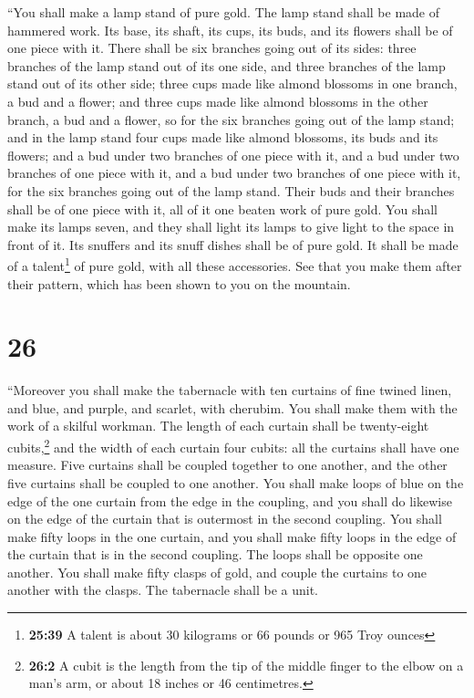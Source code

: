  ``You shall make a lamp stand of pure gold. The lamp
stand shall be made of hammered work. Its base, its shaft, its cups, its
buds, and its flowers shall be of one piece with it. 
There shall be six branches going out of its sides: three branches of
the lamp stand out of its one side, and three branches of the lamp stand
out of its other side;  three cups made like almond
blossoms in one branch, a bud and a flower; and three cups made like
almond blossoms in the other branch, a bud and a flower, so for the six
branches going out of the lamp stand;  and in the lamp
stand four cups made like almond blossoms, its buds and its flowers;
 and a bud under two branches of one piece with it, and a
bud under two branches of one piece with it, and a bud under two
branches of one piece with it, for the six branches going out of the
lamp stand.  Their buds and their branches shall be of
one piece with it, all of it one beaten work of pure gold.
 You shall make its lamps seven, and they shall light its
lamps to give light to the space in front of it.  Its
snuffers and its snuff dishes shall be of pure gold.  It
shall be made of a talent\footnote{\textbf{25:39} A talent is about 30
  kilograms or 66 pounds or 965 Troy ounces} of pure gold, with all
these accessories.  See that you make them after their
pattern, which has been shown to you on the mountain.

\hypertarget{section-25}{%
\section{26}\label{section-25}}

 ``Moreover you shall make the tabernacle with ten
curtains of fine twined linen, and blue, and purple, and scarlet, with
cherubim. You shall make them with the work of a skilful workman.
 The length of each curtain shall be twenty-eight
cubits,\footnote{\textbf{26:2} A cubit is the length from the tip of the
  middle finger to the elbow on a man's arm, or about 18 inches or 46
  centimetres.} and the width of each curtain four cubits: all the
curtains shall have one measure.  Five curtains shall be
coupled together to one another, and the other five curtains shall be
coupled to one another.  You shall make loops of blue on
the edge of the one curtain from the edge in the coupling, and you shall
do likewise on the edge of the curtain that is outermost in the second
coupling.  You shall make fifty loops in the one curtain,
and you shall make fifty loops in the edge of the curtain that is in the
second coupling. The loops shall be opposite one another. 
You shall make fifty clasps of gold, and couple the curtains to one
another with the clasps. The tabernacle shall be a unit.

